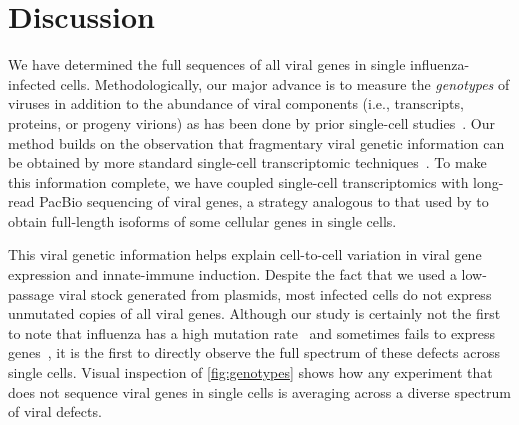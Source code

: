 \documentclass[lineno]{asm-article}
\newcommand{\FIG}[1]{\autoref{fig:#1}}
\begin{document}
\section{Discussion}
We have determined the full sequences of all viral genes in single influenza-infected cells.
Methodologically, our major advance is to measure the \emph{genotypes} of viruses in addition to the abundance of viral components (i.e., transcripts, proteins, or progeny virions) as has been done by prior single-cell studies~\cite{russell2018extreme, steuerman2018dissection, heldt2015single, wang2018cell, sjaastad2018distinct, brooke2013most, zanini2018single, zanini2018virus, saikia2018simultaneous, oneal2018west, zhu2009growth, schulte2014single, akpinar2016high}.
Our method builds on the observation that fragmentary viral genetic information can be obtained by more standard single-cell transcriptomic techniques~\cite{wang2018cell, zanini2018virus, saikia2018simultaneous}.
To make this information complete, we have coupled single-cell transcriptomics with long-read PacBio sequencing of viral genes, a strategy analogous to that used by \cite{gupta2018single} to obtain full-length isoforms of some cellular genes in single cells.

This viral genetic information helps explain cell-to-cell variation in viral gene expression and innate-immune induction.
Despite the fact that we used a low-passage viral stock generated from plasmids, most infected cells do not express unmutated copies of all viral genes.
Although our study is certainly not the first to note that influenza has a high mutation rate~\cite{parvin1986measurement, suarez1992heterogeneity, suarez1994estimation, bloom2014experimentally, pauly2017novel} and sometimes fails to express genes~\cite{russell2018extreme, heldt2015single, brooke2013most, dou2017analysis, jacobs2019incomplete}, it is the first to directly observe the full spectrum of these defects across single cells.
Visual inspection of \FIG{genotypes} shows how any experiment that does not sequence viral genes in single cells is averaging across a diverse spectrum of viral defects.
\end{document}
